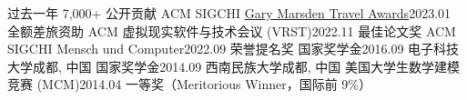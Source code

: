 {        {过去一年 7,000+ 公开贡献}{}
    \resumeSubheading
        {ACM SIGCHI \href{https://sigchi.org/awards/gary-marsden-travel-awards/}{Gary Marsden Travel Awards}}{2023.01}
        {全额差旅资助}{}
    \resumeSubheading
        {ACM 虚拟现实软件与技术会议 (VRST)}{2022.11}
        {最佳论文奖}{}
    \resumeSubheading
        {ACM SIGCHI Mensch und Computer}{2022.09}
        {荣誉提名奖}{}
    \resumeSubheading
        {国家奖学金}{2016.09}
        {电子科技大学}{成都, 中国}
    \resumeSubheading
        {国家奖学金}{2014.09}
        {西南民族大学}{成都, 中国}
    \resumeSubheading
        {美国大学生数学建模竞赛 (MCM)}{2014.04}
        {一等奖（Meritorious Winner，国际前 9\%）}{}
}
\resumeSubHeadingListEnd